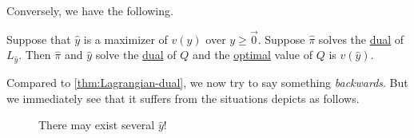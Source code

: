 Conversely, we have the following.

\begin{theorem}\label{thm:converse-Lagrangian-dual}
	Suppose that \(\hat{y}\) is a maximizer of \(v(y)\) over \(y\geq \vec{0}\). Suppose \(\hat{\pi}\) solves the \hyperref[def:dual]{dual} of \(L_{\hat{y}}\). Then \(\hat{\pi}\) and \(\hat{y}\) solve the \hyperref[def:dual]{dual} of \(Q\) and the \hyperref[def:optimal-solution]{optimal} value of \(Q\) is \(v(\hat{y})\).
\end{theorem}
\begin{intuition}
	Compared to \autoref{thm:Lagrangian-dual}, we now try to say something \emph{backwards}. But we immediately see that it suffers from the situations depicts as follows.
	\begin{figure}[H]
		\centering
		\caption{There may exist several \(\hat{y} \)!}
		\label{fig:lagrangian-maximizer}
	\end{figure}
\end{intuition}